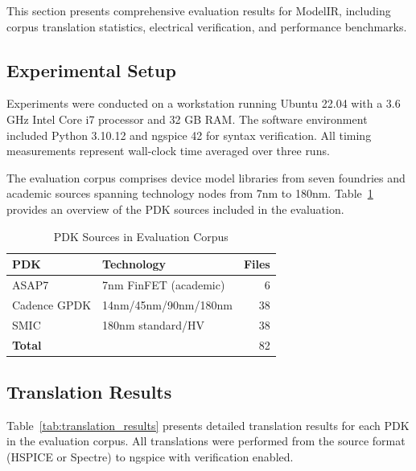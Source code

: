 \documentclass[conference]{IEEEtran}
\begin{document}
This section presents comprehensive evaluation results for ModelIR, including corpus translation statistics, electrical verification, and performance benchmarks.

\subsection{Experimental Setup}

Experiments were conducted on a workstation running Ubuntu 22.04 with a 3.6 GHz Intel Core i7 processor and 32 GB RAM. The software environment included Python 3.10.12 and ngspice 42 for syntax verification. All timing measurements represent wall-clock time averaged over three runs.

The evaluation corpus comprises device model libraries from seven foundries and academic sources spanning technology nodes from 7nm to 180nm. Table~\ref{tab:corpus_overview} provides an overview of the PDK sources included in the evaluation.

\begin{table}[htbp]
\caption{PDK Sources in Evaluation Corpus}
\label{tab:corpus_overview}
\centering
\begin{tabular}{llr}
\toprule
\textbf{PDK} & \textbf{Technology} & \textbf{Files} \\
\midrule
ASAP7 & 7nm FinFET (academic) & 6 \\
Cadence GPDK & 14nm/45nm/90nm/180nm & 38 \\
SMIC & 180nm standard/HV & 38 \\
\midrule
\textbf{Total} & & 82 \\
\bottomrule
\end{tabular}
\end{table}

\subsection{Translation Results}

Table~\ref{tab:translation_results} presents detailed translation results for each PDK in the evaluation corpus. All translations were performed from the source format (HSPICE or Spectre) to ngspice with verification enabled.
\end{document}
